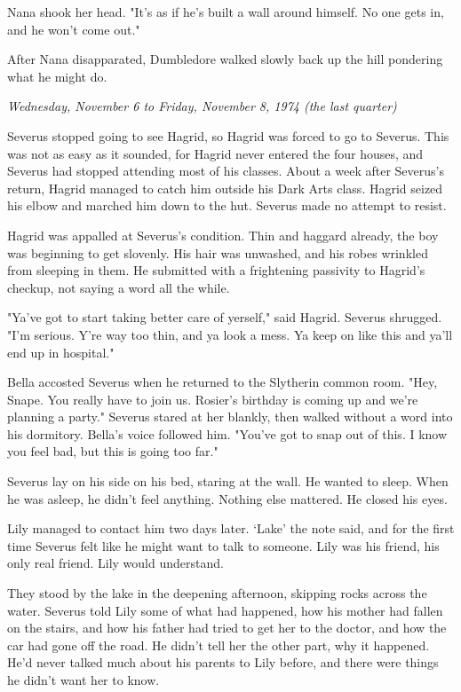 \documentclass[a4paper,11pt]{article}
\begin{document}
Nana shook her head. "It's as if he's built a wall around himself. No one gets in, and he won't come out."

After Nana disapparated, Dumbledore walked slowly back up the hill pondering what he might do.

\emph{Wednesday, November 6 to Friday, November 8, 1974 (the last quarter)}

Severus stopped going to see Hagrid, so Hagrid was forced to go to Severus. This was not as easy as it sounded, for Hagrid never entered the four houses, and Severus had stopped attending most of his classes. About a week after Severus's return, Hagrid managed to catch him outside his Dark Arts class. Hagrid seized his elbow and marched him down to the hut. Severus made no attempt to resist.

Hagrid was appalled at Severus's condition. Thin and haggard already, the boy was beginning to get slovenly. His hair was unwashed, and his robes wrinkled from sleeping in them. He submitted with a frightening passivity to Hagrid's checkup, not saying a word all the while.

"Ya've got to start taking better care of yerself," said Hagrid. Severus shrugged. "I'm serious. Y're way too thin, and ya look a mess. Ya keep on like this and ya'll end up in hospital."

Bella accosted Severus when he returned to the Slytherin common room. "Hey, Snape. You really have to join us. Rosier's birthday is coming up and we're planning a party." Severus stared at her blankly, then walked without a word into his dormitory. Bella's voice followed him. "You've got to snap out of this. I know you feel bad, but this is going too far."

Severus lay on his side on his bed, staring at the wall. He wanted to sleep. When he was asleep, he didn't feel anything. Nothing else mattered. He closed his eyes.

Lily managed to contact him two days later. `Lake' the note said, and for the first time Severus felt like he might want to talk to someone. Lily was his friend, his only real friend. Lily would understand.

They stood by the lake in the deepening afternoon, skipping rocks across the water. Severus told Lily some of what had happened, how his mother had fallen on the stairs, and how his father had tried to get her to the doctor, and how the car had gone off the road. He didn't tell her the other part, why it happened. He'd never talked much about his parents to Lily before, and there were things he didn't want her to know.
\end{document}
